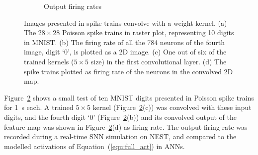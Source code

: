 \documentclass[runningheads,a4paper]{llncs}
\begin{document}
\begin{figure}[tbh!]
\begin{subfigure}[t]{0.3\textwidth}
		\caption{Output firing rates}
		\label{Fig:64}
	\end{subfigure}
	\caption{Images presented in spike trains convolve with a weight kernel. (a) The $28\times28$ Poisson spike trains in raster plot, representing 10 digits in MNIST. (b) The firing rate of all the 784 neurons of the fourth image, digit `0', is plotted as a 2D image.
		(c) One out of six of the trained kernels ($5\times5$ size) in the first convolutional layer.
		(d) The spike trains plotted as firing rate of the neurons in the convolved 2D map.}
	\label{fig:cnn}
\end{figure}

Figure~\ref{fig:cnn} shows a small test of ten MNIST digits presented in Poisson spike trains for 1~s each.
A trained $5\times5$ kernel (Figure~\ref{fig:cnn}(c)) was convolved with these input digits, and the fourth digit `0' (Figure~\ref{fig:cnn}(b)) and its convolved output of the feature map was shown in Figure~\ref{fig:cnn}(d) as firing rate.
The output firing rate was recorded during a real-time SNN simulation on NEST, and compared to the modelled activations of Equation~(\ref{equ:full_act}) in ANNs.
\end{document}
